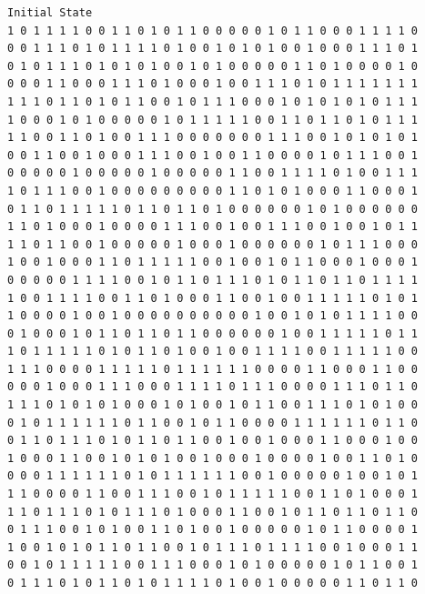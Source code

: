\documentclass[a4paper,12pt]{article}
\begin{document}
  \begin{verbatim}
Initial State 
1 0 1 1 1 1 0 0 1 1 0 1 0 1 1 0 0 0 0 0 1 0 1 1 0 0 0 1 1 1 1 0 
0 0 1 1 1 0 1 0 1 1 1 1 0 1 0 0 1 0 1 0 1 0 0 1 0 0 0 1 1 1 0 1 
0 1 0 1 1 1 0 1 0 1 0 1 0 0 1 0 1 0 0 0 0 0 1 1 0 1 0 0 0 0 1 0 
0 0 0 1 1 0 0 0 1 1 1 0 1 0 0 0 1 0 0 1 1 1 0 1 0 1 1 1 1 1 1 1 
1 1 1 0 1 1 0 1 0 1 1 0 0 1 0 1 1 1 0 0 0 1 0 1 0 1 0 1 0 1 1 1 
1 0 0 0 1 0 1 0 0 0 0 0 1 0 1 1 1 1 1 0 0 1 1 0 1 1 0 1 0 1 1 1 
1 1 0 0 1 1 0 1 0 0 1 1 1 0 0 0 0 0 0 0 1 1 1 0 0 1 0 1 0 1 0 1 
0 0 1 1 0 0 1 0 0 0 1 1 1 0 0 1 0 0 1 1 0 0 0 0 1 0 1 1 1 0 0 1 
0 0 0 0 0 1 0 0 0 0 0 1 0 0 0 0 0 1 1 0 0 1 1 1 1 0 1 0 0 1 1 1 
1 0 1 1 1 0 0 1 0 0 0 0 0 0 0 0 0 1 1 0 1 0 1 0 0 0 1 1 0 0 0 1 
0 1 1 0 1 1 1 1 1 0 1 1 0 1 1 0 1 0 0 0 0 0 0 1 0 1 0 0 0 0 0 0 
1 1 0 1 0 0 0 1 0 0 0 0 1 1 1 0 0 1 0 0 1 1 1 0 0 1 0 0 1 0 1 1 
1 1 0 1 1 0 0 1 0 0 0 0 0 1 0 0 0 1 0 0 0 0 0 0 1 0 1 1 1 0 0 0 
1 0 0 1 0 0 0 1 1 0 1 1 1 1 1 0 0 1 0 0 1 0 1 1 0 0 0 1 0 0 0 1 
0 0 0 0 0 1 1 1 1 0 0 1 0 1 1 0 1 1 1 0 1 0 1 1 0 1 1 0 1 1 1 1 
1 0 0 1 1 1 1 0 0 1 1 0 1 0 0 0 1 1 0 0 1 0 0 1 1 1 1 1 0 1 0 1 
1 0 0 0 0 1 0 0 1 0 0 0 0 0 0 0 0 0 0 1 0 0 1 0 1 0 1 1 1 1 0 0 
0 1 0 0 0 1 0 1 1 0 1 1 0 1 1 0 0 0 0 0 0 1 0 0 1 1 1 1 1 0 1 1 
1 0 1 1 1 1 1 0 1 0 1 1 0 1 0 0 1 0 0 1 1 1 1 0 0 1 1 1 1 1 0 0 
1 1 1 0 0 0 0 1 1 1 1 1 0 1 1 1 1 1 1 0 0 0 0 1 1 0 0 0 1 1 0 0 
0 0 0 1 0 0 0 1 1 1 0 0 0 1 1 1 1 0 1 1 1 0 0 0 0 1 1 1 0 1 1 0 
1 1 1 0 1 0 1 0 1 0 0 0 1 0 1 0 0 1 0 1 1 0 0 1 1 1 0 1 0 1 0 0 
0 1 0 1 1 1 1 1 1 0 1 1 0 0 1 0 1 1 0 0 0 0 1 1 1 1 1 1 0 1 1 0 
0 1 1 0 1 1 1 0 1 0 1 1 0 1 1 0 0 1 0 0 1 0 0 0 1 1 0 0 0 1 0 0 
1 0 0 0 1 1 0 0 1 0 1 0 1 0 0 1 0 0 0 1 0 0 0 0 1 0 0 1 1 0 1 0 
0 0 0 1 1 1 1 1 1 0 1 0 1 1 1 1 1 1 0 0 1 0 0 0 0 0 1 0 0 1 0 1 
1 1 0 0 0 0 1 1 0 0 1 1 1 0 0 1 0 1 1 1 1 1 0 0 1 1 0 1 0 0 0 1 
1 1 0 1 1 1 0 1 0 1 1 1 0 1 0 0 0 1 1 0 0 1 0 1 1 0 1 1 0 1 1 0 
0 1 1 1 0 0 1 0 1 0 0 1 1 0 1 0 0 1 0 0 0 0 0 1 0 1 1 0 0 0 0 1 
1 0 0 1 0 1 0 1 1 0 1 1 0 0 1 0 1 1 1 0 1 1 1 1 0 0 1 0 0 0 1 1 
0 0 1 0 1 1 1 1 1 0 0 1 1 1 0 0 0 1 0 1 0 0 0 0 0 1 0 1 1 0 0 1 
0 1 1 1 0 1 0 1 1 0 1 0 1 1 1 1 0 1 0 0 1 0 0 0 0 0 1 1 0 1 1 0 


\end{verbatim}
\end{document}
